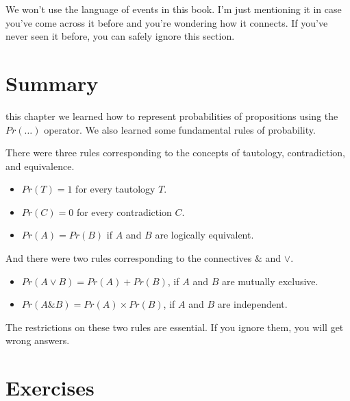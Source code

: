 \documentclass[justified]{tufte-book}
\providecommand{\tightlist}{%
  \setlength{\itemsep}{0pt}\setlength{\parskip}{0pt}}
\renewcommand{\wedge}{\mathbin{\&}}
\newcommand{\p}{Pr}
\theoremstyle{definition}
\theoremstyle{definition}
\theoremstyle{definition}
\theoremstyle{remark}
\begin{document}
We won't use the language of events in this book. I'm just mentioning it in case you've come across it before and you're wondering how it connects. If you've never seen it before, you can safely ignore this section.

\hypertarget{summary-1}{%
\section{Summary}\label{summary-1}}

 this chapter we learned how to represent probabilities of propositions using the \(Pr(\ldots)\) operator. We also learned some fundamental rules of probability.

There were three rules corresponding to the concepts of tautology, contradiction, and equivalence.

\begin{itemize}
\tightlist
\item
  \(\p(T) = 1\) for every tautology \(T\).
\item
  \(\p(C) = 0\) for every contradiction \(C\).
\item
  \(\p(A) = \p(B)\) if \(A\) and \(B\) are logically equivalent.
\end{itemize}

And there were two rules corresponding to the connectives \(\wedge\) and \(\vee\).

\begin{itemize}
\tightlist
\item
  \(Pr(A \vee B) = Pr(A) + Pr(B)\), if \(A\) and \(B\) are mutually exclusive.
\item
  \(Pr(A \wedge B) = Pr(A) \times Pr(B)\), if \(A\) and \(B\) are independent.
\end{itemize}

The restrictions on these two rules are essential. If you ignore them, you will get wrong answers.

\hypertarget{exercises-4}{%
\section*{Exercises}\label{exercises-4}}
\end{document}
